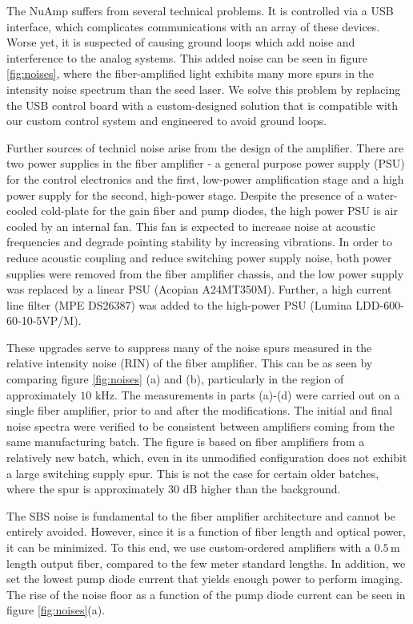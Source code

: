 \documentclass[twocolumn,aps,pra,showpacs,preprintnumbers,bibnotes]{revtex4-1}
\begin{document}
The NuAmp suffers from several technical problems. 
It is controlled via a USB interface, which complicates communications with an array of these devices.  
Worse yet, it is suspected of causing ground loops which add noise and interference to the analog systems. 
This added noise can be seen in figure \ref{fig:noises}, where the fiber-amplified light exhibits many more spurs in the intensity noise spectrum than the seed laser.
We solve this problem by replacing the USB control board with a custom-designed solution  that is compatible with our custom control system and engineered to avoid ground loops.

Further sources of technicl noise arise from the design of the amplifier. There are two power supplies in the fiber amplifier - a general purpose power supply (PSU) for the control electronics and the first, low-power amplification stage and a high power supply for the second, high-power stage. 
Despite the presence of a water-cooled cold-plate for the gain fiber and pump diodes, the high power PSU is air cooled by an internal fan.
This fan is expected to increase noise at acoustic frequencies and degrade pointing stability by increasing vibrations.
In order to reduce acoustic coupling and reduce switching power supply noise, both power supplies were removed from the fiber amplifier chassis, and the low power supply was replaced by a linear PSU (Acopian A24MT350M). 
Further, a high current line filter (MPE DS26387) was added to the high-power PSU (Lumina LDD-600-60-10-5VP/M).

These upgrades serve to suppress many of the noise spurs measured in the relative intensity noise (RIN) of the fiber amplifier. 
This can be as seen by comparing figure \ref{fig:noises} (a) and (b), particularly in the region of approximately $10$ kHz. 
The measurements in parts (a)-(d) were carried out on a single fiber amplifier, prior to and after the modifications. The initial and final noise spectra were verified to be consistent between amplifiers coming from the same manufacturing batch.
The figure is based on fiber amplifiers from a relatively new batch, which, even in its unmodified configuration does not exhibit a large switching supply spur. 
This is not the case for certain older batches, where the spur is approximately 30 dB higher than the background.

The SBS noise is fundamental to the fiber amplifier architecture and cannot be entirely avoided. However, since it is a function of fiber length and optical power, it can be minimized. To this end, we use custom-ordered amplifiers with a $0.5\,$m length output fiber, compared to the few meter standard lengths.
In addition, we set the lowest pump diode current that yields enough power to perform imaging. 
The rise of the noise floor as a function of the pump diode current can be seen in figure \ref{fig:noises}(a).
\end{document}

